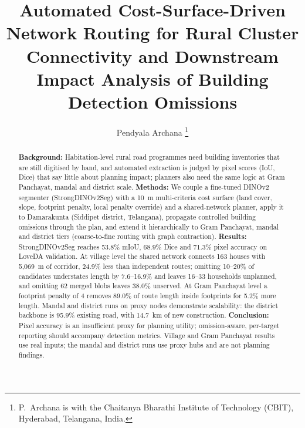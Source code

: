 \documentclass[journal]{IEEEtran}
\begin{document}
\title{Automated Cost-Surface-Driven Network Routing for Rural Cluster Connectivity and Downstream Impact Analysis of Building Detection Omissions}

\author{Pendyala Archana%
\thanks{P.~Archana is with the Chaitanya Bharathi Institute of Technology (CBIT), Hyderabad, Telangana, India.}}

\maketitle

\begin{abstract}
\textbf{Background:} Habitation-level rural road programmes need building inventories that are still digitised by hand, and automated extraction is judged by pixel scores (IoU, Dice) that say little about planning impact; planners also need the same logic at Gram Panchayat, mandal and district scale. \textbf{Methods:} We couple a fine-tuned DINOv2 segmenter (StrongDINOv2Seg) with a 10~m multi-criteria cost surface (land cover, slope, footprint penalty, local penalty override) and a shared-network planner, apply it to Damarakunta (Siddipet district, Telangana), propagate controlled building omissions through the plan, and extend it hierarchically to Gram Panchayat, mandal and district tiers (coarse-to-fine routing with graph contraction). \textbf{Results:} StrongDINOv2Seg reaches 53.8\% mIoU, 68.9\% Dice and 71.3\% pixel accuracy on LoveDA validation. At village level the shared network connects 163 houses with 5{,}069~m of corridor, 24.9\% less than independent routes; omitting 10--20\% of candidates understates length by 7.6--16.9\% and leaves 16--33 households unplanned, and omitting 62 merged blobs leaves 38.0\% unserved. At Gram Panchayat level a footprint penalty of 4 removes 89.0\% of route length inside footprints for 5.2\% more length. Mandal and district runs on proxy nodes demonstrate scalability: the district backbone is 95.9\% existing road, with 14.7~km of new construction. \textbf{Conclusion:} Pixel accuracy is an insufficient proxy for planning utility; omission-aware, per-target reporting should accompany detection metrics. Village and Gram Panchayat results use real inputs; the mandal and district runs use proxy hubs and are not planning findings.
\end{abstract}
\end{document}
